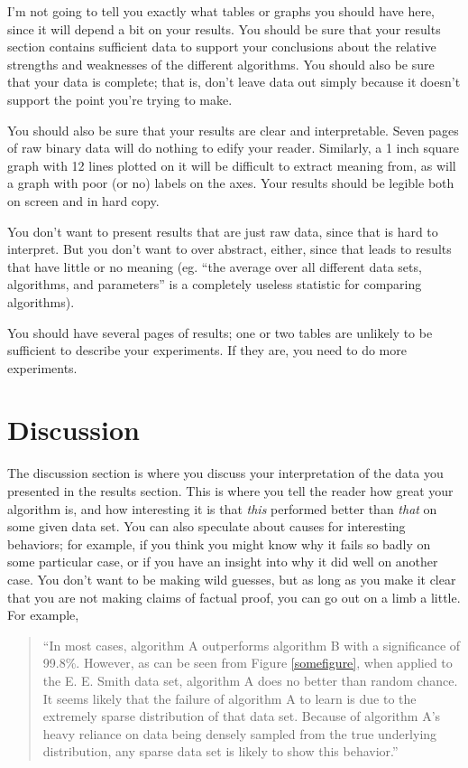 \documentclass[12pt,letterpaper]{article}
\begin{document}
I'm not going to tell you exactly what tables or graphs you should have here,
since it will depend a bit on your results.  You should be sure that your
results section contains sufficient data to support your conclusions about the
relative strengths and weaknesses of the different algorithms.  You should also
be sure that your data is complete; that is, don't leave data out simply because
it doesn't support the point you're trying to make.

You should also be sure that your results are clear and interpretable.  Seven
pages of raw binary data will do nothing to edify your reader.  Similarly, a
1 inch square graph with 12 lines plotted on it will be difficult to extract
meaning from, as will a graph with poor (or no) labels on the axes.  Your
results should be legible both on screen and in hard copy.

You don't want to present results that are just raw data, since that is hard to
interpret.  But you don't want to over abstract, either, since that leads to
results that have little or no meaning (eg. ``the average over all different
data sets, algorithms, and parameters'' is a completely useless statistic for
comparing algorithms).

You should have several pages of results; one or two tables are unlikely to be
sufficient to describe your experiments.  If they are, you need to do more
experiments.

\section{Discussion}
The discussion section is where you discuss your interpretation of the data you
presented in the results section.  This is where you tell the reader how great
your algorithm is, and how interesting it is that \emph{this} performed better
than \emph{that} on some given data set.  You can also speculate about causes
for interesting behaviors; for example, if you think you might know why it fails
so badly on some particular case, or if you have an insight into why it did well
on another case.  You don't want to be making wild guesses, but as long as you
make it clear that you are not making claims of factual proof, you can go out on
a limb a little.  For example,

\begin{quote}
``In most cases, algorithm A outperforms algorithm B with a significance of
99.8\%.  However, as can be seen from Figure \ref{somefigure}, when applied to
the E. E. Smith data set, algorithm A does no better than random chance.  It
seems likely that the failure of algorithm A to learn is due to the extremely
sparse distribution of that data set.  Because of algorithm A's heavy reliance
on data being densely sampled from the true underlying distribution, any sparse
data set is likely to show this behavior.''
\end{quote}
\end{document}
